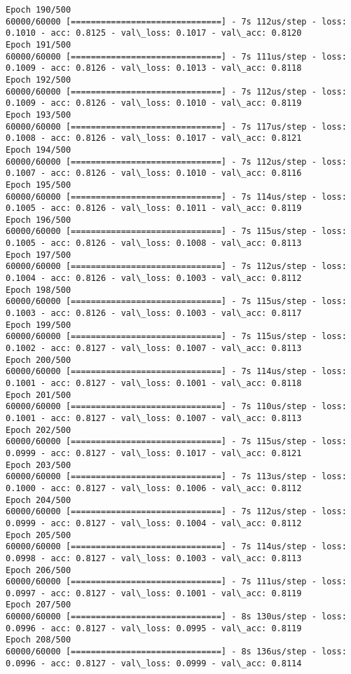 \documentclass[11pt]{article}
\begin{document}
\begin{Verbatim}[commandchars=\\\{\}]
Epoch 190/500
60000/60000 [==============================] - 7s 112us/step - loss: 0.1010 - acc: 0.8125 - val\_loss: 0.1017 - val\_acc: 0.8120
Epoch 191/500
60000/60000 [==============================] - 7s 111us/step - loss: 0.1009 - acc: 0.8126 - val\_loss: 0.1013 - val\_acc: 0.8118
Epoch 192/500
60000/60000 [==============================] - 7s 112us/step - loss: 0.1009 - acc: 0.8126 - val\_loss: 0.1010 - val\_acc: 0.8119
Epoch 193/500
60000/60000 [==============================] - 7s 117us/step - loss: 0.1008 - acc: 0.8126 - val\_loss: 0.1017 - val\_acc: 0.8121
Epoch 194/500
60000/60000 [==============================] - 7s 112us/step - loss: 0.1007 - acc: 0.8126 - val\_loss: 0.1010 - val\_acc: 0.8116
Epoch 195/500
60000/60000 [==============================] - 7s 114us/step - loss: 0.1005 - acc: 0.8126 - val\_loss: 0.1011 - val\_acc: 0.8119
Epoch 196/500
60000/60000 [==============================] - 7s 115us/step - loss: 0.1005 - acc: 0.8126 - val\_loss: 0.1008 - val\_acc: 0.8113
Epoch 197/500
60000/60000 [==============================] - 7s 112us/step - loss: 0.1004 - acc: 0.8126 - val\_loss: 0.1003 - val\_acc: 0.8112
Epoch 198/500
60000/60000 [==============================] - 7s 115us/step - loss: 0.1003 - acc: 0.8126 - val\_loss: 0.1003 - val\_acc: 0.8117
Epoch 199/500
60000/60000 [==============================] - 7s 115us/step - loss: 0.1002 - acc: 0.8127 - val\_loss: 0.1007 - val\_acc: 0.8113
Epoch 200/500
60000/60000 [==============================] - 7s 114us/step - loss: 0.1001 - acc: 0.8127 - val\_loss: 0.1001 - val\_acc: 0.8118
Epoch 201/500
60000/60000 [==============================] - 7s 110us/step - loss: 0.1001 - acc: 0.8127 - val\_loss: 0.1007 - val\_acc: 0.8113
Epoch 202/500
60000/60000 [==============================] - 7s 115us/step - loss: 0.0999 - acc: 0.8127 - val\_loss: 0.1017 - val\_acc: 0.8121
Epoch 203/500
60000/60000 [==============================] - 7s 113us/step - loss: 0.1000 - acc: 0.8127 - val\_loss: 0.1006 - val\_acc: 0.8112
Epoch 204/500
60000/60000 [==============================] - 7s 112us/step - loss: 0.0999 - acc: 0.8127 - val\_loss: 0.1004 - val\_acc: 0.8112
Epoch 205/500
60000/60000 [==============================] - 7s 114us/step - loss: 0.0998 - acc: 0.8127 - val\_loss: 0.1003 - val\_acc: 0.8113
Epoch 206/500
60000/60000 [==============================] - 7s 111us/step - loss: 0.0997 - acc: 0.8127 - val\_loss: 0.1001 - val\_acc: 0.8119
Epoch 207/500
60000/60000 [==============================] - 8s 130us/step - loss: 0.0996 - acc: 0.8127 - val\_loss: 0.0995 - val\_acc: 0.8119
Epoch 208/500
60000/60000 [==============================] - 8s 136us/step - loss: 0.0996 - acc: 0.8127 - val\_loss: 0.0999 - val\_acc: 0.8114

\end{Verbatim}
\end{document}
